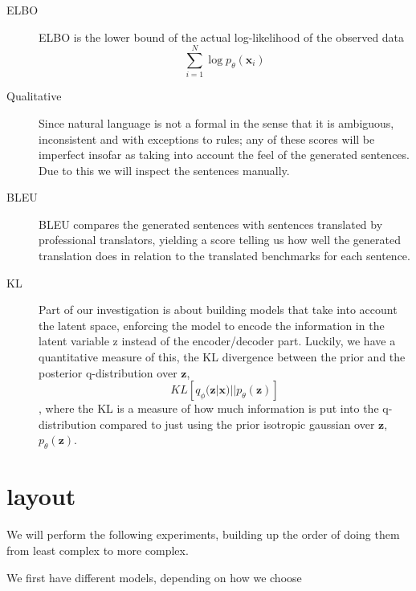 \begin{description}
\item[ELBO] ELBO is the lower bound of the actual log-likelihood of the observed
  data
  \begin{equation*}
    \sum_{i=1}^{N} \log p_{\theta}(\bm{x}_i)
  \end{equation*}
\item[Qualitative] Since natural language is not a formal in the sense that it
  is ambiguous, inconsistent and with exceptions to rules; any of these scores
  will be imperfect insofar as taking into account the feel of the generated
  sentences. Due to this we will inspect the sentences manually.
\item[BLEU] BLEU compares the generated sentences with sentences translated by
  professional translators, yielding a score telling us how well the generated
  translation does in relation to the translated benchmarks for each sentence.
\item[KL] Part of our investigation is about building models that take into
  account the latent space, enforcing the model to encode the information in the
  latent variable z instead of the encoder/decoder part. Luckily, we have a
  quantitative measure of this, the KL divergence between the prior and the
  posterior q-distribution over $\bm{z}$,
  \begin{equation*}
    KL[q_{\phi}(\bm{z} | \bm{x}) || p_{\theta}(\bm{z})]
  \end{equation*}
  , where the KL is a measure of how much information is put into the
  q-distribution compared to just using the prior isotropic gaussian over
  $\bm{z}$, $p_{\theta}(\bm{z})$.
\end{description}

\section{layout}

We will perform the following experiments, building up the order of doing them
from least complex to more complex.

We first have different models, depending on how we choose

